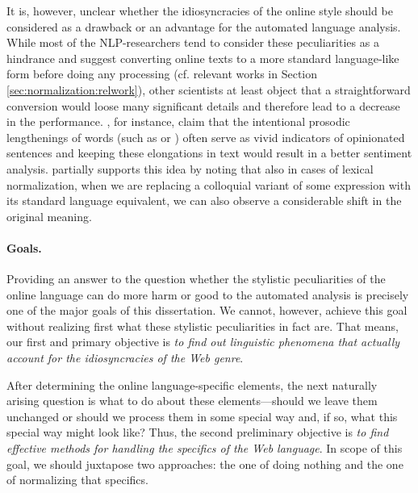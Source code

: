 It is, however, unclear whether the idiosyncracies of the online style
should be considered as a drawback or an advantage for the automated
language analysis.  While most of the NLP-researchers tend to consider
these peculiarities as a hindrance and suggest converting online texts
to a more standard language-like form before doing any processing
(cf. relevant works in Section \ref{sec:normalization:relwork}), other
scientists at least object that a straightforward conversion would
loose many significant details and therefore lead to a decrease in the
performance.  \citet{Brody:11}, for instance, claim that the
intentional prosodic lengthenings of words (such as  or ) often serve as vivid indicators
of opinionated sentences and keeping these elongations in text would
result in a better sentiment analysis.  \citet{Eisenstein:13}
partially supports this idea by noting that also in cases of lexical
normalization, when we are replacing a colloquial variant of some
expression with its standard language equivalent, we can also observe
a considerable shift in the original meaning.  %

\paragraph{Goals.}

Providing an answer to the question whether the stylistic
peculiarities of the online language can do more harm or good to the
automated analysis is precisely one of the major goals of this
dissertation.  We cannot, however, achieve this goal without realizing
first what these stylistic peculiarities in fact are.  That means, our
first and primary objective is \emph{to find out linguistic phenomena
  that actually account for the idiosyncracies of the Web genre}.

After determining the online language-specific elements, the next
naturally arising question is what to do about these elements---should
we leave them unchanged or should we process them in some special way
and, if so, what this special way might look like?  Thus, the second
preliminary objective is \emph{to find effective methods for handling
  the specifics of the Web language}.  In scope of this goal, we
should juxtapose two approaches: the one of doing nothing and the one
of normalizing that specifics.

